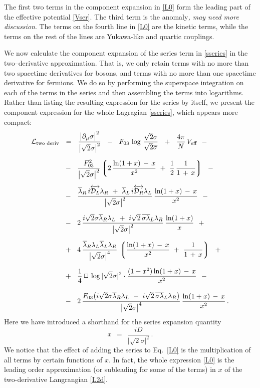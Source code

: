 \documentclass[epsfig,12pt]{article}
\def\beq{\begin{equation}}
\def\eeq{\end{equation}}
\newcommand{\cell}{{\mathcal L}}
\newcommand{\p}{\partial}
\newcommand{\ov}{\overline}
\newcommand{\md}{\mathcal{D}}
\newcommand{\lgr}{\left\lgroup}
\newcommand{\rgr}{\right\rgroup}
\begin{document}
	The first two terms in the component expansion in \eqref{L0} form the 
	leading part of the effective potential \eqref{Vser}.
	The third term is the anomaly{\it, may need more discussion}.
	The terms on the fourth line in \eqref{L0} are the kinetic terms, 
	while the terms on the rest of the lines are Yukawa-like and quartic couplings.

	We now calculate the component expansion of the series term in \eqref{sseries}
	in the two--derivative approximation. 
	That is, we only retain terms with no more than two spacetime derivatives for bosons,
	and terms with no more than one spacetime derivative for fermions.
	We do so by performing the superspace integration on each of the terms in the
	series and then assembling the terms into logarithms.
	Rather than listing the resulting expression for the series by itself, we present the
	component expression for the whole Lagragian \eqref{sseries}, which appears more compact:
\begin{align}
%
\notag
	\cell_\text{two deriv} &    ~~=~~  
	\frac{ \big|\p_\mu \sigma\big|^2 }
	{ \big|\sqrt{2}\sigma\big|^2 }
	~~-~~
	F_{03}\, \log\, \frac{\sqrt{2}\sigma}{\sqrt{2}\ov\sigma}
	~~+~~
	\frac{4\pi}{N}\, V_\text{eff}
	~~-
	\\[2mm]
%
\notag
	&
	~~-~~
	\frac{F_{03}^2}{\big|\sqrt{2}\sigma\big|^2}
	\lgr 2\, \frac{ \ln (1 + x) \,-\, x } { x^2 }  ~+~
		\frac{1}{2}\, \frac{1}{1 \,+\, x} \rgr
	~~-
	\\[2mm]
%
\notag
	&
	~~-~~
	\frac{
		\ov\lambda{}_R\, i\overleftrightarrow{\md_L} \lambda_R  ~+~ 
		\ov\lambda{}_L\, i\overleftrightarrow{\md_R} \lambda_L
	} { \big|\sqrt{2}\sigma\big|^2 }
	\,
	\frac{ \ln (1 + x) \,-\, x } { x^2 }
	~~-
	\\[2mm]
%
\label{L2d}
	&
	~~-~~ 
	2\,\frac{
		i\sqrt{2}\sigma\ov\lambda{}_R\lambda_L  ~+~  
		i\sqrt{2}\,\ov{\sigma\lambda}{}_L\lambda_R
	} { \big|\sqrt{2}\sigma\big|^2 }\,
	\frac{ \ln (1 + x) } { x }
	~~+
	\\[2mm]
%
\notag
	&
	~~+~~
	4\,\frac{
		\ov\lambda{}_R \lambda_L \ov\lambda{}_L \lambda_R
	} { \big|\sqrt{2}\sigma\big|^4 }\,
	\lgr \frac{ \ln (1 + x) \,-\, x } { x^2 }  ~+~
		\frac{1}{1 \,+\, x} \rgr
	~~+
	\\[2mm]
%
\notag
	&
	~~+~~
	\frac{1}{4}\,\Box\,\log |\sqrt{2}\sigma|^2 \cdot
	\frac{ (1 - x^2) \ln (1 + x) \,-\, x } { x^2 }
	~~-
	\\[3mm]
%
\notag
	&
	~~-~~
	2\,\frac{ F_{03} \big( i\sqrt{2}\sigma\ov\lambda{}_R\lambda_L ~-~
			       i\sqrt{2}\,\ov{\sigma\lambda}{}_L\lambda_R \big) }
		{ \big|\sqrt{2}\sigma\big|^4 }\,
	\frac{ \ln (1 + x) \,-\, x } { x^2 }\,.
\end{align}
	Here we have introduced a shorthand for the series expansion quantity
\beq
	x    ~~=~~    \frac{iD}{\big|\sqrt{2}\sigma\big|^2}\,.
\eeq
	We notice that the effect of adding the series to Eq.~\eqref{L0} is the multiplication of all terms 
	by certain functions of $ x $.
	In fact, the whole expression \eqref{L0}
	is the leading order approximation (or subleading for some of the terms) in $ x $ of 
	the two-derivative Langrangian \eqref{L2d}.
\end{document}
